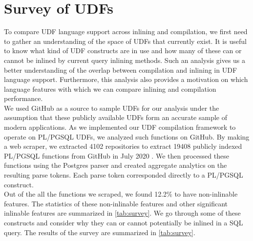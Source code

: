 \documentclass[12pt]{cmuthesis}
\newcommand{\sysname}{NoisePage\xspace}
\begin{document}



\chapter{Survey of UDFs}
\label{sec:survey}
To compare UDF language support across inlining and compilation, we first need to gather an understanding of the space of UDFs that currently exist. It is useful to know what kind of UDF constructs are in use and how many of these can or cannot be inlined by current query inlining methods. Such an analysis gives us a better understanding of the overlap between compilation and inlining in UDF language support. Furthermore, this analysis also provides a motivation on which language features with which we can compare inlining and compilation performance.\\
 
We used GitHub as a source to sample UDFs for our analysis under the assumption that these publicly available UDFs form an accurate sample of modern applications. As we implemented our UDF compilation framework to operate on PL/PGSQL UDFs, we analyzed such functions on GitHub. By making a web scraper, we extracted 4102 repositories to extract 19408 publicly indexed PL/PGSQL functions from GitHub in July 2020 \cite{surveycode}. We then processed these functions using the Postgres parser and created aggregate analytics on the resulting parse tokens. Each parse token corresponded directly to a PL/PGSQL construct.\\

Out of the all the functions we scraped, we found 12.2\% to have non-inlinable features. The statistics of these non-inlinable features and other significant inlinable features are summarized in \cref{tab:survey}.
  We go through some of these constructs and consider why they can or cannot potentially be inlined in a SQL query.
The results of the survey are summarized in \cref{tab:survey}.\\
\end{document}
